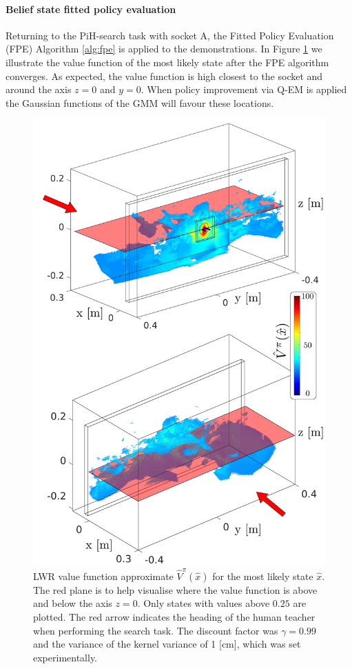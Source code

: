 \documentclass[final,3p,times,twocolumn]{elsarticle}
\begin{document}
\paragraph{Belief state fitted policy evaluation}

Returning to the PiH-search task with socket A, the Fitted Policy Evaluation (FPE) Algorithm \ref{alg:fpe} is applied to the 
demonstrations. In Figure \ref{fig:ch4:Figure1}  we illustrate the value function of the most likely state after the FPE algorithm converges. 
As expected, the value function is high closest to the socket and around the axis $z=0$ and $y=0$. 
When policy improvement via Q-EM is applied the Gaussian functions of the GMM will favour these locations. 

\begin{figure}
 \centering
 \includegraphics[width=\textwidth]{./Figures/ValueFunction/value_func_final_v2.pdf}
 \caption{LWR value function approximate $\hat{V}^{\pi}(\hat{x})$ for the most likely state $\hat{x}$. 
 The red plane is to help visualise where the value function is above and below the axis $z=0$. Only states with values above
 $0.25$ are plotted.  The red arrow indicates the heading of the human teacher when performing the search task. The discount 
 factor was $\gamma=0.99$ and the variance of the kernel variance of 1 [cm], which was set experimentally.
}
 \label{fig:ch4:Figure1}
\end{figure}
\end{document}
